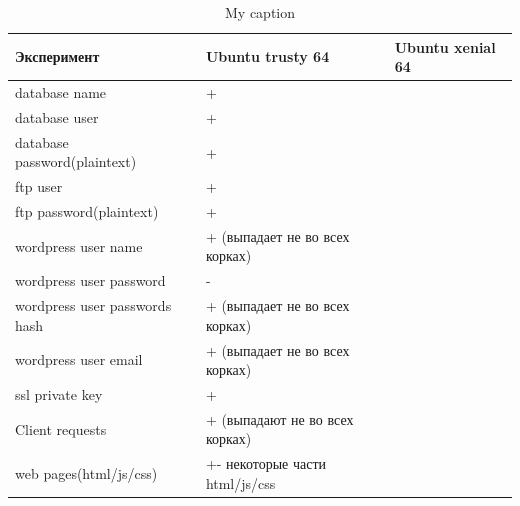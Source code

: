 \documentclass[20pt]{article}
\begin{document}
\begin{table}[]
\centering
\caption{My caption}
\label{my-label}
\begin{tabular}{|l|l|l|}
\hline
Эксперимент                                                                                 & Ubuntu trusty 64               & Ubuntu xenial 64 \\ \hline
database name                                                                                   & +                              &                  \\ \hline
database user                                                                                   & +                              &                  \\ \hline
database password(plaintext)                                                                    & +                              &                  \\ \hline
ftp user                                                                                        & +                              &                  \\ \hline
ftp password(plaintext)                                                                         & +                              &                  \\ \hline
wordpress user name                                                                             & + (выпадает не во всех корках) &                  \\ \hline
wordpress user password                                                                         & -                              &                  \\ \hline
wordpress user passwords hash                                                                   & + (выпадает не во всех корках) &                  \\ \hline
wordpress user email                                                                            & + (выпадает не во всех корках) &                  \\ \hline
ssl private key                                                                                 & +                              &                  \\ \hline
Client requests                                                                                 & + (выпадают не во всех корках) &                  \\ \hline
web pages(html/js/css)                                                                          & +- некоторые части html/js/css &                  \\ \hline

\end{tabular}
\end{table}
\end{document}
